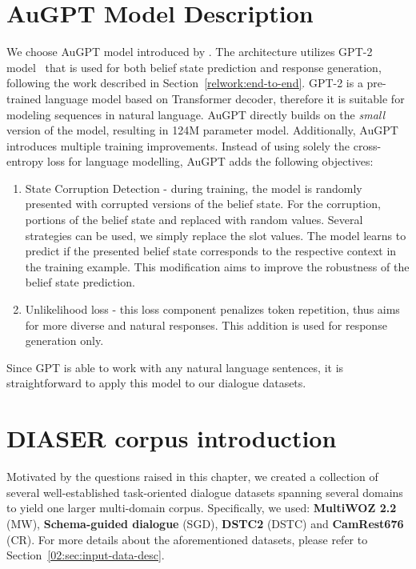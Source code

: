 \section{AuGPT Model Description}
We choose AuGPT model introduced by \citet{kulhanek-etal-2021-augpt}.
The architecture utilizes GPT-2 model~\cite{radford2019language} that is used for both belief state prediction and response generation, following the work described in Section~\ref{relwork:end-to-end}.
GPT-2 is a pre-trained language model based on Transformer decoder, therefore it is suitable for modeling sequences in natural language.
AuGPT directly builds on the \emph{small} version of the model, resulting in 124M parameter model.
Additionally, AuGPT introduces multiple training improvements.
Instead of using solely the cross-entropy loss for language modelling, AuGPT adds the following objectives:
\begin{enumerate}
    \item State Corruption Detection - during training, the model is randomly presented with corrupted versions of the belief state.
    For the corruption, portions of the belief state and replaced with random values.
    Several strategies can be used, we simply replace the slot values.
    The model learns to predict if the presented belief state corresponds to the respective context in the training example.
    This modification aims to improve the robustness of the belief state prediction.
    \item Unlikelihood loss - this loss component penalizes token repetition, thus aims for more diverse and natural responses. This addition is used for response generation only.
\end{enumerate}
Since GPT is able to work with any natural language sentences, it is straightforward to apply this model to our dialogue datasets.

\section{DIASER corpus introduction}
\label{sec:diaser}
Motivated by the questions raised in this chapter, we created a collection of several well-established task-oriented dialogue datasets spanning several domains to yield one larger multi-domain corpus.
Specifically, we used: \textbf{MultiWOZ 2.2} (MW), \textbf{Schema-guided dialogue} (SGD), \textbf{DSTC2} (DSTC) and \textbf{CamRest676} (CR).
For more details about the aforementioned datasets, please refer to Section~\ref{02:sec:input-data-desc}.

